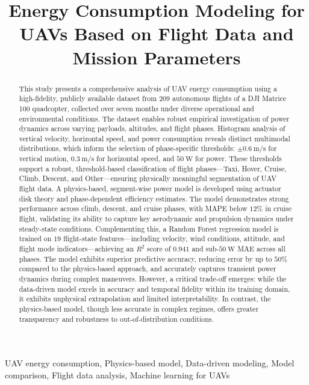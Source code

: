 \documentclass[conference, letter]{IEEEtran}
\title{ {Energy Consumption Modeling for UAVs Based on Flight Data and Mission Parameters}
\vspace{0.5cm}
}
\author{\IEEEauthorblockN{Research Task Group 4, \textit{Masters in Air Transport and Logistics}}
\IEEEauthorblockA{Chair of Air Transport and Logistics \\
TU Dresden, Dresden, Germany \\}
}
\begin{document}
\maketitle
\thispagestyle{fancy}

\noindent \begin{abstract}
This study presents a comprehensive analysis of UAV energy consumption using a high-fidelity, publicly available dataset from $209$ autonomous flights of a DJI Matrice 100 quadcopter, collected over seven months under diverse operational and environmental conditions. The dataset enables robust empirical investigation of power dynamics across varying payloads, altitudes, and flight phases. Histogram analysis of vertical velocity, horizontal speed, and power consumption reveals distinct multimodal distributions, which inform the selection of phase-specific thresholds:
$\pm0.6~\text{m/s}$ for vertical motion, $0.3~\text{m/s}$ for horizontal speed, and $50~\text{W}$ for power. These thresholds support a robust, threshold-based classification of flight phases—Taxi, Hover, Cruise, Climb, Descent, and Other—ensuring physically meaningful segmentation of UAV flight data.
A physics-based, segment-wise power model is developed using actuator disk theory and phase-dependent efficiency estimates. The model demonstrates strong performance across climb, descent, and cruise phases, with MAPE below $12\%$ in cruise flight, validating its ability to capture key aerodynamic and propulsion dynamics under steady-state conditions.
Complementing this, a Random Forest regression model is trained on $19$ flight-state features—including velocity, wind conditions, attitude, and flight mode indicators—achieving an
$R^2$ score of $0.941$ and sub-$50~\text{W}$ MAE across all phases. The model exhibits superior predictive accuracy, reducing error by up to $50\%$ compared to the physics-based approach, and accurately captures transient power dynamics during complex maneuvers.
However, a critical trade-off emerges: while the data-driven model excels in accuracy and temporal fidelity within its training domain, it exhibits unphysical extrapolation and limited interpretability. In contrast, the physics-based model, though less accurate in complex regimes, offers greater transparency and robustness to out-of-distribution conditions.

\end{abstract}

\vspace{0.3cm}

\begin{IEEEkeywords}
UAV energy consumption, Physics-based model, Data-driven modeling, Model comparison, Flight data analysis, Machine learning for UAVs
\end{IEEEkeywords}
% 
\end{document}
